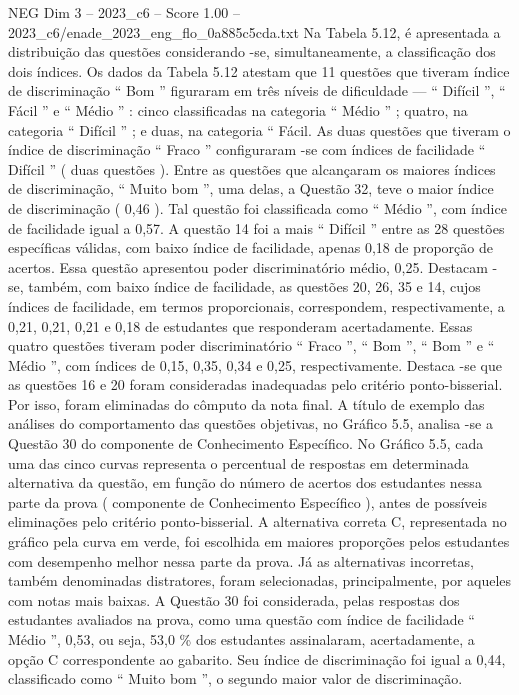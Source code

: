 \begin{textsample}{NEG Dim 3 – 2023\_c6 – Score 1.00 – 2023\_c6/enade\_2023\_eng\_flo\_0a885c5cda.txt}
Na Tabela 5.12, é apresentada a distribuição das questões considerando -se, simultaneamente, a classificação dos dois índices.
Os dados da Tabela 5.12 atestam que 11 questões que tiveram índice de discriminação “ Bom ” figuraram em três níveis de dificuldade — “ Difícil ”, “ Fácil ” e “ Médio ” : cinco classificadas na categoria “ Médio ” ; quatro, na categoria “ Difícil ” ; e duas, na categoria “ Fácil.
As duas questões que tiveram o índice de discriminação “ Fraco ” configuraram -se com índices de facilidade “ Difícil ” ( duas questões ).
Entre as questões que alcançaram os maiores índices de discriminação, “ Muito bom ”, uma delas, a Questão 32, teve o maior índice de discriminação ( 0,46 ).
Tal questão foi classificada como “ Médio ”, com índice de facilidade igual a 0,57.
A questão 14 foi a mais “ Difícil ” entre as 28 questões específicas válidas, com baixo índice de facilidade, apenas 0,18 de proporção de acertos.
Essa questão apresentou poder discriminatório médio, 0,25.
Destacam -se, também, com baixo índice de facilidade, as questões 20, 26, 35 e 14, cujos índices de facilidade, em termos proporcionais, correspondem, respectivamente, a 0,21, 0,21, 0,21 e 0,18 de estudantes que responderam acertadamente.
Essas quatro questões tiveram poder discriminatório “ Fraco ”, “ Bom ”, “ Bom ” e “ Médio ”, com índices de 0,15, 0,35, 0,34 e 0,25, respectivamente.
Destaca -se que as questões 16 e 20 foram consideradas inadequadas pelo critério ponto-bisserial.
Por isso, foram eliminadas do cômputo da nota final.
A título de exemplo das análises do comportamento das questões objetivas, no Gráfico 5.5, analisa -se a Questão 30 do componente de Conhecimento Específico.
No Gráfico 5.5, cada uma das cinco curvas representa o percentual de respostas em determinada alternativa da questão, em função do número de acertos dos estudantes nessa parte da prova ( componente de Conhecimento Específico ), antes de possíveis eliminações pelo critério ponto-bisserial.
A alternativa correta C, representada no gráfico pela curva em verde, foi escolhida em maiores proporções pelos estudantes com desempenho melhor nessa parte da prova.
Já as alternativas incorretas, também denominadas distratores, foram selecionadas, principalmente, por aqueles com notas mais baixas.
A Questão 30 foi considerada, pelas respostas dos estudantes avaliados na prova, como uma questão com índice de facilidade “ Médio ”, 0,53, ou seja, 53,0 \% dos estudantes assinalaram, acertadamente, a opção C correspondente ao gabarito.
Seu índice de discriminação foi igual a 0,44, classificado como “ Muito bom ”, o segundo maior valor de discriminação.

\end{textsample}
